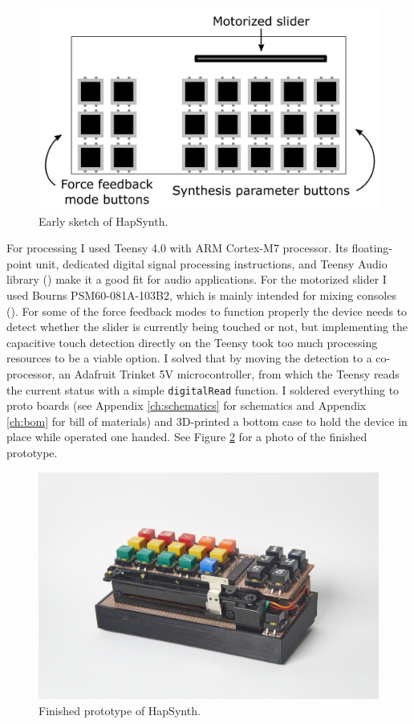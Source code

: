 \begin{figure}[h!]
	\centering
	\includegraphics[width=1.0\linewidth]{figures/Adaptive.png}
	\caption{Early sketch of HapSynth.}
	\label{sketch}
\end{figure}

For processing I used Teensy 4.0 with ARM Cortex-M7 processor. Its floating-point unit, dedicated digital signal processing instructions, and Teensy Audio library (\cite{pjrc2023}) make it a good fit for audio applications. For the motorized slider I used Bourns PSM60-081A-103B2, which is mainly intended for mixing consoles (\cite{bourns2020}). For some of the force feedback modes to function properly the device needs to detect whether the slider is currently being touched or not, but implementing the capacitive touch detection directly on the Teensy took too much processing resources to be a viable option. I solved that by moving the detection to a co-processor, an Adafruit Trinket 5V microcontroller, from which the Teensy reads the current status with a simple \texttt{digitalRead} function. I soldered everything to proto boards (see Appendix \ref{ch:schematics} for schematics and Appendix \ref{ch:bom} for bill of materials) and 3D-printed a bottom case to hold the device in place while operated one handed. See Figure \ref{proto} for a photo of the finished prototype.

\begin{figure}[h]
	\centering
	\includegraphics[width=1.0\linewidth]{figures/HapSynth.jpg}
	\caption{Finished prototype of HapSynth.}
	\label{proto}
\end{figure}

